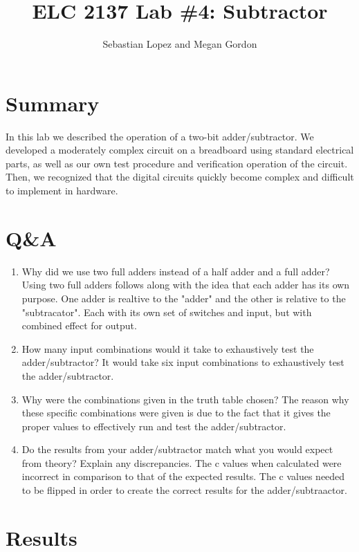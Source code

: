 \documentclass[11pt]{article}
\begin{document}
\title{ELC 2137 Lab \#4: Subtractor}
\author{Sebastian Lopez and Megan Gordon}

\maketitle


\section*{Summary}

In this lab we described the operation of a two-bit adder/subtractor. We developed a moderately complex circuit on a breadboard using standard electrical parts, as well as our own test procedure and verification operation of the circuit. Then, we recognized that the digital circuits quickly become complex and difficult to implement in hardware. 

\section*{Q\&A}

\begin{enumerate}
	\item Why did we use two full adders instead of a half adder and a full adder? 
	Using two full adders follows along with the idea that each adder has its own purpose. One adder is realtive to the "adder" and the other is relative to the "subtracator". Each with its own set of switches and input, but with combined effect for output.   
	\item How many input combinations would it take to exhaustively test the adder/subtractor? 
	It would take six input combinations to exhaustively test the adder/subtractor.
	\item Why were the combinations given in the truth table chosen?
	The reason why these specific combinations were given is due to the fact that it gives the proper values to effectively run and test the adder/subtractor. 
	\item Do the results from your adder/subtractor match what you would expect from theory? Explain any discrepancies. 
	The c values when calculated were incorrect in comparison to that of the expected results. The c values needed to be flipped in order to create the correct results for the adder/subtraactor. 
	
\end{enumerate}

\section*{Results}
\end{document}
